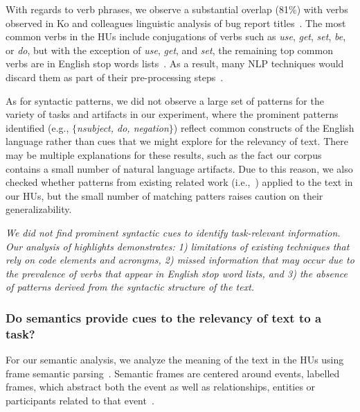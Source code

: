 With regards to verb phrases, we observe a substantial
overlap (81\%) with verbs observed in Ko and colleagues linguistic analysis
of bug report titles~\cite{Ko2006}.
The most common verbs in the HUs include conjugations of verbs such as \textit{use}, \textit{get}, \textit{set}, \textit{be}, or \textit{do},
but with the exception of \textit{use}, \textit{get}, and \textit{set}, the
remaining top common verbs are in English stop words lists~\cite{jurafsky2014speech}. As a result, many
\acs{NLP} techniques would discard them as part of their pre-processing
steps~\cite{Bavota2016}.






As for syntactic patterns, we did not observe a large set of patterns for the variety of tasks and artifacts in our experiment,
where the prominent patterns identified (e.g., $\{$\textit{nsubject, do, negation}$\}$)
reflect common constructs of the English language rather than cues that we might explore for the relevancy of text.
There may be multiple explanations for these results, such as
the fact our corpus contains a small number of natural language artifacts.
Due to this reason, we also checked whether patterns from existing related work (i.e.,~\cite{Chaparro2017, Robillard2015}) applied to the text in our HUs, 
but the small number of matching patters 
raises caution on
their generalizability.



\medskip
\begin{bluequote}
    \textit{We did not find prominent syntactic cues to identify
    task-relevant information. Our analysis of highlights demonstrates:
    1) limitations of existing techniques that rely on code
    elements and acronyms, 2) missed
    information that may occur due to the prevalence of verbs that
    appear in English stop word lists,
    and 3) the absence of patterns derived from the syntactic structure of
    the text.}
\end{bluequote}

 



\subsubsection{Do semantics provide cues to the relevancy of text to a task?}
\label{cp3:semantic-analysis}


For our semantic analysis, we
analyze the meaning of the text in the 
 HUs
using frame semantic parsing~\cite{fillmore1976frame, jurafsky2014speech}.
Semantic frames are centered around events, labelled frames, 
which abstract both the event
as well as relationships, entities or participants related to that
event~\cite{fillmore1976frame, Baker1998frame}. 


